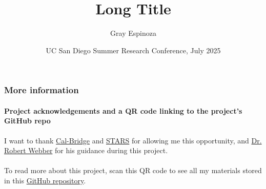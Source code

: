\documentclass[aspectratio=43]{beamer}
\title[Short Title]{Long Title}
\author{Gray Espinoza}
\institute{California State University,\\Fullerton}
\date[13 July 2025]{UC San Diego Summer Research Conference, July 2025}
\begin{document}
\begin{frame}[plain]
  \titlepage
\end{frame}

\begin{frame}
  \frametitle{More information}
  \framesubtitle{Project acknowledgements and a QR code linking to
  the project's GitHub repo}

  I want to thank \href{https://calbridge.org}{Cal-Bridge} and
  \href{https://grad.ucsd.edu/oar2/oar2office/programs/undergraduate-programs/stars}{STARS}
  for allowing me this opportunity, and
  \href{https://sites.google.com/ucsd.edu/rwebber}{Dr. Robert Webber}
  for his guidance during this project.
  \\~\\

  To read more about this project, scan this QR code to see all my
  materials stored in this
  \href{https://github.com/grayespinoza/cbsp25}{GitHub repository}.
  \\~\\

\end{frame}
\end{document}
